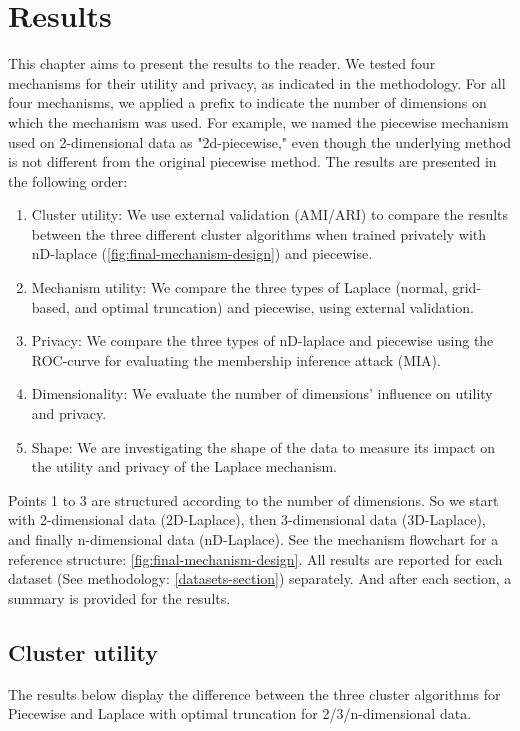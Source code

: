 \chapter{Results}
This chapter aims to present the results to the reader.
We tested four mechanisms for their utility and privacy, as indicated in the methodology.
For all four mechanisms, we applied a prefix to indicate the number of dimensions on which the mechanism was used.
For example, we named the piecewise mechanism used on 2-dimensional data as "2d-piecewise," even though the underlying method is not different from the original piecewise method.
The results are presented in the following order:
\begin{enumerate}
    \item Cluster utility: We use external validation (AMI/ARI) to compare the results between the three different cluster algorithms when trained privately with nD-laplace (\ref{fig:final-mechanism-design}) and piecewise.
    \item Mechanism utility: We compare the three types of Laplace (normal, grid-based, and optimal truncation) and piecewise, using external validation.
    \item Privacy: We compare the three types of nD-laplace and piecewise using the ROC-curve for evaluating the membership inference attack (MIA).
    \item Dimensionality: We evaluate the number of dimensions' influence on utility and privacy.
    \item Shape: We are investigating the shape of the data to measure its impact on the utility and privacy of the Laplace mechanism.
\end{enumerate}
Points 1 to 3 are structured according to the number of dimensions. So we start with 2-dimensional data (2D-Laplace), then 3-dimensional data (3D-Laplace), and finally n-dimensional data (nD-Laplace). See the mechanism flowchart for a reference structure: \ref{fig:final-mechanism-design}.
All results are reported for each dataset (See methodology: \ref{datasets-section}) separately.
And after each section, a summary is provided for the results.

\newpage
\section{Cluster utility}
The results below display the difference between the three cluster algorithms for Piecewise and Laplace with optimal truncation for 2/3/n-dimensional data.

